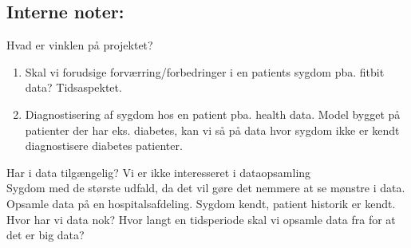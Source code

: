 \subsection*{Interne noter:}
Hvad er vinklen på projektet?
\begin{enumerate}
    \item Skal vi forudsige forværring/forbedringer i en patients sygdom pba. fitbit data? Tidsaspektet.
    \item Diagnostisering af sygdom hos en patient pba. health data. Model bygget på patienter der har eks. diabetes, kan vi så på data hvor sygdom ikke er kendt diagnostisere diabetes patienter.
\end{enumerate}
Har i data tilgængelig? Vi er ikke interesseret i dataopsamling \\
Sygdom med de største udfald, da det vil gøre det nemmere at se mønstre i data. \\
Opsamle data på en hospitalsafdeling. Sygdom kendt, patient historik er kendt. \\
Hvor har vi data nok? Hvor langt en tidsperiode skal vi opsamle data fra for at det er big data?\\

